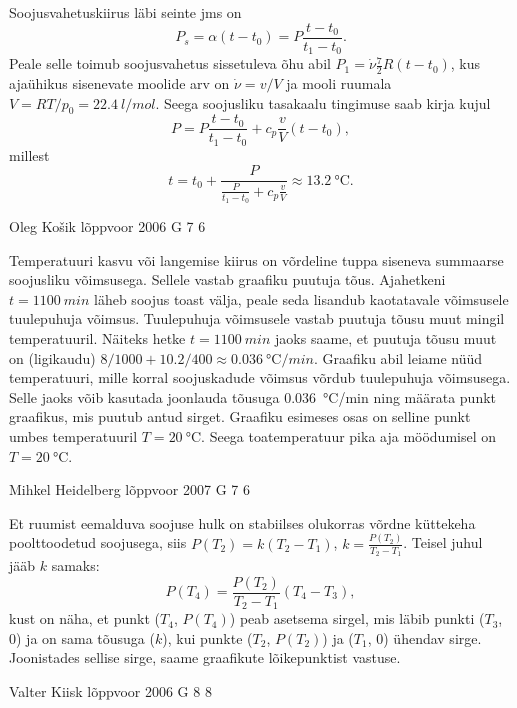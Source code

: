 \documentclass[11pt, twoside]{article}
\begin{document}
{{\ifSolution
Soojusvahetuskiirus läbi seinte jms on $$P_s=\alpha (t-t_0)=P\frac{t-t_0}{t_1-t_0}.$$
Peale selle toimub soojusvahetus sissetuleva õhu abil
$P_1=\dot\nu \frac 72 R (t-t_0)$, kus ajaühikus sisenevate moolide arv on $\dot\nu=v/V$ ja mooli ruumala $V=RT/p_0=\SI{22,4}{l/mol}$.
Seega soojusliku tasakaalu tingimuse saab kirja kujul
$$P= P\frac{t-t_0}{t_1-t_0} + c_p\frac vV(t-t_0),$$
millest $$t=t_0+\frac{P}{\frac{P}{t_1-t_0}+c_p\frac{v}{V}}
\approx \SI{13,2}{\celsius}.$$
\fi
}

{Oleg Košik} %
{lõppvoor} %
{2006} %
{G 7} %
{6} %
{

\ifSolution
Temperatuuri kasvu või langemise kiirus on võrdeline tuppa siseneva summaarse soojusliku võimsusega. Sellele vastab graafiku puutuja tõus. Ajahetkeni $t = \SI{1100}{min}$ läheb soojus toast välja, peale seda lisandub kaotatavale võimsusele tuulepuhuja võimsus. Tuulepuhuja võimsusele vastab puutuja tõusu muut mingil temperatuuril. Näiteks hetke $t = \SI{1100}{min}$ jaoks saame, et puutuja tõusu muut on (ligikaudu) $8/1000 + \num{10,2}/400 \approx \SI{0,036}{\celsius/min}$. Graafiku abil leiame nüüd temperatuuri, mille korral soojuskadude võimsus võrdub tuulepuhuja võimsusega. Selle jaoks võib kasutada joonlauda tõusuga \SI{0,036}{\celsius/min} ning määrata punkt graafikus, mis puutub antud sirget. Graafiku esimeses osas on selline punkt umbes temperatuuril $T = \SI{20}{\celsius}$. Seega toatemperatuur pika aja möödumisel on $T = \SI{20}{\celsius}$.
\fi
}

{Mihkel Heidelberg} %
{lõppvoor} %
{2007} %
{G 7} %
{6} %
{

\ifSolution
Et ruumist eemalduva soojuse hulk on stabiilses olukorras võrdne küttekeha poolttoodetud soojusega, siis $P(T_2) = k(T_2 - T_1)$, $k = \frac{P(T_2)}{T_2-T_1}$. Teisel juhul jääb $k$ samaks:
\[
P(T_4) = \frac{P(T_2)}{T_2-T_1} (T_4 - T_3), 
\]
kust on näha, et punkt ($T_4$, $P(T_4)$) peab asetsema sirgel, mis läbib punkti ($T_3$, $0$) ja on sama tõusuga ($k$), kui punkte ($T_2$, $P(T_2)$) ja ($T_1$, $0$) ühendav sirge. Joonistades sellise sirge, saame graafikute lõikepunktist vastuse. 
\fi
}

{Valter Kiisk} %
{lõppvoor} %
{2006} %
{G 8} %
{8} %
{

}}
\end{document}
